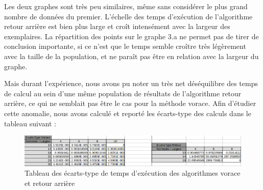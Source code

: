 \documentclass[10pt,a4paper]{article}
\begin{document}
Les deux graphes sont très peu similaires, même sans considérer le plus grand nombre de données du premier. L'échelle des temps d'exécution de l'algorithme retour arrière est bien plus large et croît intensément avec la largeur des exemplaires. La répartition des points sur le graphe 3.a ne permet pas de tirer de conclusion importante, si ce n'est que le temps semble croître très légèrement avec la taille de la population, et ne paraît pas être en relation avec la largeur du graphe.

Mais durant l'expérience, nous avons pu noter un très net déséquilibre des temps de calcul au sein d'une même population de résultats de l'algorithme retour arrière, ce qui ne semblait pas être le cas pour la méthode vorace. Afin d'étudier cette anomalie, nous avons calculé et reporté les écarts-type des calculs dans le tableau suivant : \\[2em]

\begin{figure}[h!]
	\centering
	\includegraphics[width=\textwidth]{spreadsheet/ecarts}
	\caption{Tableau des écarts-type de temps d'exécution des algorithmes vorace et retour arrière}
\end{figure}
\end{document}
